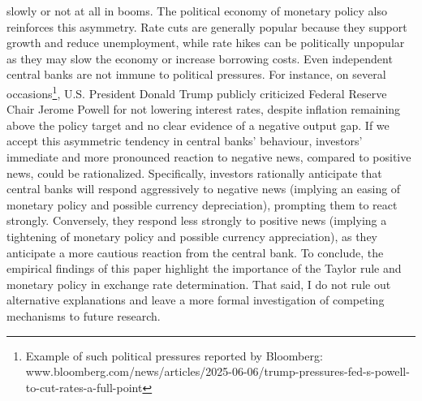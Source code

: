 \documentclass[12pt,oneside,letter]{article}
\begin{document}
slowly or not at all in booms. The political economy of monetary policy also reinforces this asymmetry. Rate cuts are generally popular because they support growth and reduce unemployment, while rate hikes can be politically unpopular as they may slow the economy or increase borrowing costs. Even independent central banks are not immune to political pressures. For instance, on several occasions\footnote{Example of such political pressures reported by Bloomberg: www.bloomberg.com/news/articles/2025-06-06/trump-pressures-fed-s-powell-to-cut-rates-a-full-point}, U.S. President Donald Trump publicly criticized Federal Reserve Chair Jerome Powell for not lowering interest rates, despite inflation remaining above the policy target and no clear evidence of a negative output gap. If we accept this asymmetric tendency in central banks' behaviour, investors' immediate and more pronounced reaction to negative news, compared to positive news, could be rationalized. Specifically, investors rationally anticipate that central banks will respond aggressively to negative news (implying an easing of monetary policy and possible currency depreciation), prompting them to react strongly. Conversely, they respond less strongly to positive news (implying a tightening of monetary policy and possible currency appreciation), as they anticipate a more cautious reaction from the central bank. To conclude, the empirical findings of this paper highlight the importance of the Taylor rule and monetary policy in exchange rate determination. That said, I do not rule out alternative explanations and leave a more formal investigation of competing mechanisms to future research.
\end{document}
